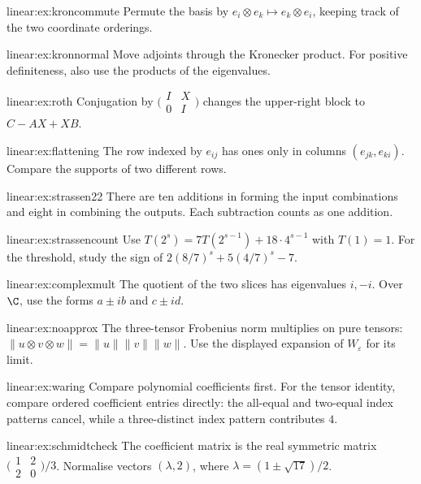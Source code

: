 \begin{hint}{linear:ex:kroncommute}
Permute the basis by $e_i\otimes e_k\mapsto e_k\otimes e_i$, keeping track of the two coordinate orderings.
\end{hint}
\begin{hint}{linear:ex:kronnormal}
Move adjoints through the Kronecker product. For positive definiteness, also use the products of the eigenvalues.
\end{hint}
\begin{hint}{linear:ex:roth}
Conjugation by $\bigl(\begin{smallmatrix}I&X\\0&I\end{smallmatrix}\bigr)$ changes the upper-right block to $C-AX+XB$.
\end{hint}
\begin{hint}{linear:ex:flattening}
The row indexed by $e_{ij}$ has ones only in columns $(e_{jk},e_{ki})$. Compare the supports of two different rows.
\end{hint}
\begin{hint}{linear:ex:strassen22}
There are ten additions in forming the input combinations and eight in combining the outputs. Each subtraction counts as one addition.
\end{hint}
\begin{hint}{linear:ex:strassencount}
Use $T(2^s)=7T(2^{s-1})+18\cdot4^{s-1}$ with $T(1)=1$. For the threshold, study the sign of $2(8/7)^s+5(4/7)^s-7$.
\end{hint}
\begin{hint}{linear:ex:complexmult}
The quotient of the two slices has eigenvalues $i,-i$. Over $\C$, use the forms $a\pm ib$ and $c\pm id$.
\end{hint}
\begin{hint}{linear:ex:noapprox}
The three-tensor Frobenius norm multiplies on pure tensors: $\|u\otimes v\otimes w\|=\|u\|\|v\|\|w\|$. Use the displayed expansion of $W_\varepsilon$ for its limit.
\end{hint}
\begin{hint}{linear:ex:waring}
Compare polynomial coefficients first. For the tensor identity, compare ordered coefficient entries directly: the all-equal and two-equal index patterns cancel, while a three-distinct index pattern contributes $4$.
\end{hint}
\begin{hint}{linear:ex:schmidtcheck}
The coefficient matrix is the real symmetric matrix $\bigl(\begin{smallmatrix}1&2\\2&0\end{smallmatrix}\bigr)/3$. Normalise vectors $(\lambda,2)$, where $\lambda=(1\pm\sqrt{17})/2$.
\end{hint}
